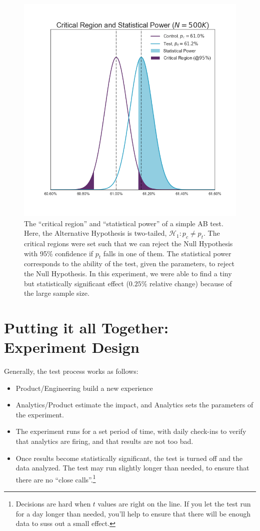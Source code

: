 \documentclass{article}
\numberwithin{equation}{section}
\begin{document}
\begin{figure}[h!]
	\includegraphics[scale=0.45]{critical_region_and_statistical_power}
	\centering
	\captionsetup{width=0.6\textwidth}
	\caption{\label{fig_crit_region} The ``critical region'' and ``statistical power'' of a simple AB test. Here, the Alternative Hypothesis is two-tailed, $\mathcal{H}_1: p_c \neq p_t$. The critical regions were set such that we can reject the Null Hypothesis with 95\% confidence if $p_t$ falls in one of them. The statistical power corresponds to the ability of the test, given the parameters, to reject the Null Hypothesis. In this experiment, we were able to find a tiny but statistically significant effect ($0.25\%$ relative change) because of the large sample size.}
\end{figure}

\section{Putting it all Together: Experiment Design}

Generally, the test process works as follows:
\begin{itemize}
	\item Product/Engineering build a new experience
	\item Analytics/Product estimate the impact, and Analytics sets the parameters of the experiment.
	\item The experiment runs for a set period of time, with daily check-ins to verify that analytics are firing, and that results are not too bad.
	\item Once results become statistically significant, the test is turned off and the data analyzed. The test may run slightly longer than needed, to ensure that there are no ``close calls''.\footnote{Decisions are hard when $t$ values are right on the line. If you let the test run for a day longer than needed, you'll help to ensure that there will be enough data to suss out a small effect.}
\end{itemize}
\end{document}
